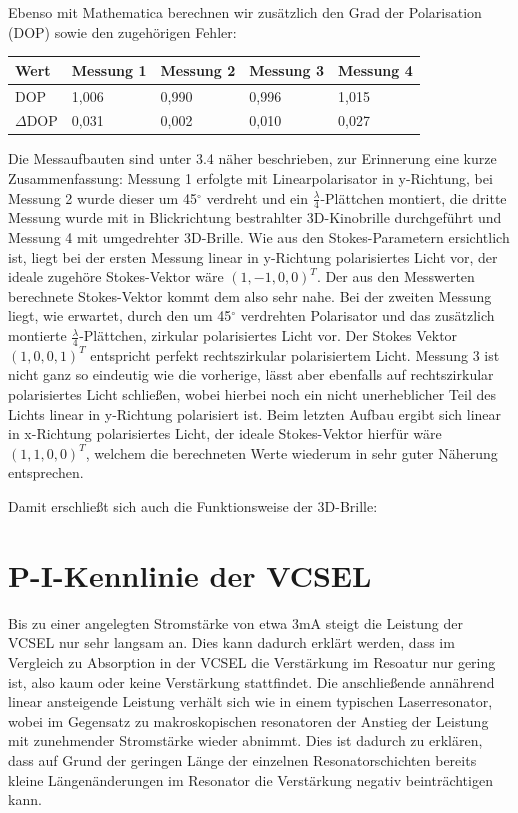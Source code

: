 \documentclass[bigchapter,colorback,accentcolor=tud4b,linedtoc,11pt]{tudreport}
\begin{document}
Ebenso mit Mathematica berechnen wir zusätzlich den Grad der Polarisation (DOP) sowie den zugehörigen Fehler: 

\begin{center}
  \begin{tabular}{|p{3cm}|p{3cm}|p{3cm}|p{3cm}|p{3cm}|}
    \hline
        Wert & Messung 1 & Messung 2 & Messung 3 & Messung 4 \\ \hline
        DOP & 1,006 & 0,990 & 0,996 & 1,015 \\ \hline
        $\Delta$DOP & 0,031 & 0,002 & 0,010 & 0,027 \\ \hline
\end{tabular}
\end{center}

Die Messaufbauten sind unter 3.4 näher beschrieben, zur Erinnerung eine kurze Zusammenfassung: Messung 1 erfolgte mit Linearpolarisator in y-Richtung, bei Messung 2 wurde dieser um 45$^{\circ}$ verdreht und ein $\frac{\lambda}{4}$-Plättchen montiert, die dritte Messung wurde mit in Blickrichtung bestrahlter 3D-Kinobrille durchgeführt und Messung 4 mit umgedrehter 3D-Brille. Wie aus den Stokes-Parametern ersichtlich ist, liegt bei der ersten Messung linear in y-Richtung polarisiertes Licht vor, der ideale zugehöre Stokes-Vektor wäre $(1,-1,0,0)^T$. Der aus den Messwerten berechnete Stokes-Vektor kommt dem also sehr nahe. Bei der zweiten Messung liegt, wie erwartet, durch den um 45$^{\circ}$ verdrehten Polarisator und das zusätzlich montierte $\frac{\lambda}{4}$-Plättchen, zirkular polarisiertes Licht vor. Der Stokes Vektor $(1,0,0,1)^T$ entspricht perfekt rechtszirkular polarisiertem Licht. Messung 3 ist nicht ganz so eindeutig wie die vorherige, lässt aber ebenfalls auf rechtszirkular polarisiertes Licht schließen, wobei hierbei noch ein nicht unerheblicher Teil des Lichts linear in y-Richtung polarisiert ist. Beim letzten Aufbau ergibt sich linear in x-Richtung polarisiertes Licht, der ideale Stokes-Vektor hierfür wäre $(1,1,0,0)^T$, welchem die berechneten Werte wiederum in sehr guter Näherung entsprechen.

Damit erschließt sich auch die Funktionsweise der 3D-Brille: 

\section{P-I-Kennlinie der VCSEL}
Bis zu einer angelegten Stromstärke von etwa 3mA steigt die Leistung der VCSEL nur sehr langsam an. Dies kann dadurch erklärt werden, dass im Vergleich zu Absorption in der VCSEL die Verstärkung im Resoatur nur gering ist, also kaum oder keine Verstärkung stattfindet. Die anschließende annährend linear ansteigende Leistung verhält sich wie in einem typischen Laserresonator, wobei im Gegensatz zu makroskopischen resonatoren der Anstieg der Leistung mit zunehmender Stromstärke wieder abnimmt. Dies ist dadurch zu erklären, dass auf Grund der geringen Länge der einzelnen Resonatorschichten bereits kleine Längenänderungen im Resonator die Verstärkung negativ beinträchtigen kann.
\end{document}
